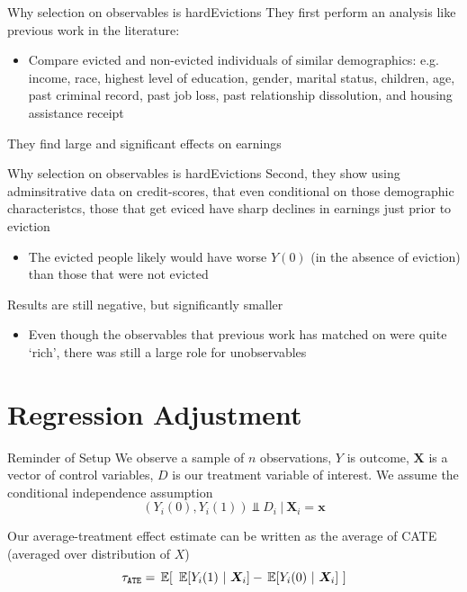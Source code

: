 \documentclass[aspectratio=169,t,11pt,table]{beamer}
\begin{document}
\begin{frame}{Why selection on observables is hard}{Evictions}
  They first perform an analysis like previous work in the literature:
  \begin{itemize}
    \item Compare evicted and non-evicted individuals of similar demographics: e.g. income, race, highest level of education, gender, marital status,
    children, age, past criminal record, past job loss, past relationship dissolution, and housing assistance receipt
  \end{itemize}
  
  \bigskip
  They find large and significant effects on earnings
\end{frame}

\begin{frame}{Why selection on observables is hard}{Evictions}
  Second, they show using adminsitrative data on credit-scores, that even conditional on those demographic characteristcs, those that get eviced have sharp declines in earnings just prior to eviction
  \begin{itemize}
    \item The evicted people likely would have worse $Y(0)$ (in the absence of eviction) than those that were not evicted
  \end{itemize}

  \pause
  \bigskip
  Results are still negative, but significantly smaller
  \begin{itemize}
    \item Even though the observables that previous work has matched on were quite `rich', there was still a large role for unobservables
  \end{itemize}
\end{frame}



\section{Regression Adjustment}

\begin{frame}{Reminder of Setup}
  We observe a sample of $n$ observations, $Y$ is outcome, $\bm{X}$ is a vector of control variables, $D$ is our treatment variable of interest. We assume the conditional independence assumption
  $$
    (Y_{i}(0), Y_{i}(1)) \Perp D_i \ \vert \ \bm{X}_i = \bm{x}
  $$

  \pause
  \bigskip
  Our average-treatment effect estimate can be written as the average of CATE (averaged over distribution of $X$)
  $$
    \tau_{\texttt{ATE}} = \expec{\ \expec{Y_i(1)}{\bm{X}_i} - \expec{Y_i(0)}{\bm{X}_i} \ }
  $$
\end{frame}
\end{document}
